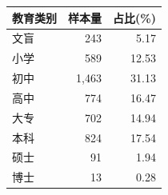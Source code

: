 \begin{tabular}{lrr}
\toprule
教育类别 & 样本量 & 占比(\%) \\
\midrule
文盲 & 243 & 5.17 \\
小学 & 589 & 12.53 \\
初中 & 1,463 & 31.13 \\
高中 & 774 & 16.47 \\
大专 & 702 & 14.94 \\
本科 & 824 & 17.54 \\
硕士 & 91 & 1.94 \\
博士 & 13 & 0.28 \\
\bottomrule
\end{tabular}
